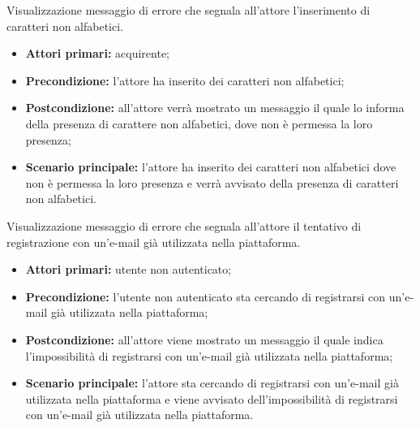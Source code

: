 
Visualizzazione messaggio di errore che segnala all'attore l'inserimento di caratteri non alfabetici.
\begin{itemize}
    \item \textbf{Attori primari:} acquirente;
    \item \textbf{Precondizione:} l'attore ha inserito dei caratteri non alfabetici;
    \item \textbf{Postcondizione:} all'attore verrà mostrato un messaggio il quale lo informa della presenza di carattere non alfabetici, dove non è permessa la loro presenza;
    \item \textbf{Scenario principale:} l'attore ha inserito dei caratteri non alfabetici dove non è permessa la loro presenza e verrà avvisato della presenza di caratteri non alfabetici.
\end{itemize}


Visualizzazione messaggio di errore che segnala all'attore il tentativo di registrazione con un'e-mail già utilizzata nella piattaforma.
\begin{itemize}
    \item \textbf{Attori primari:} utente non autenticato;
    \item \textbf{Precondizione:} l'utente non autenticato sta cercando di registrarsi con un'e-mail già utilizzata nella piattaforma;
    \item \textbf{Postcondizione:} all'attore viene mostrato un messaggio il quale indica l'impossibilità di registrarsi con un'e-mail già utilizzata nella piattaforma;
    \item \textbf{Scenario principale:} l'attore sta cercando di registrarsi con un'e-mail già utilizzata nella piattaforma e viene avvisato dell'impossibilità di registrarsi con un'e-mail già utilizzata nella piattaforma.
\end{itemize}


